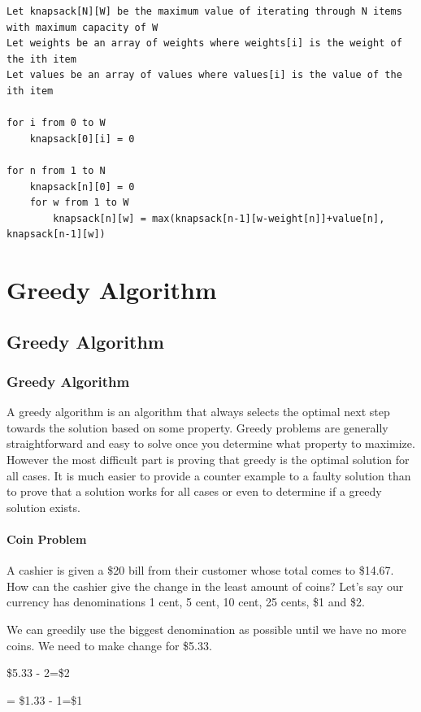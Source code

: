 \documentclass[11pt,oneside]{book}
\begin{document}
\begin{lstlisting}
Let knapsack[N][W] be the maximum value of iterating through N items with maximum capacity of W
Let weights be an array of weights where weights[i] is the weight of the ith item
Let values be an array of values where values[i] is the value of the ith item

for i from 0 to W
    knapsack[0][i] = 0

for n from 1 to N
    knapsack[n][0] = 0
    for w from 1 to W
        knapsack[n][w] = max(knapsack[n-1][w-weight[n]]+value[n], knapsack[n-1][w])
\end{lstlisting}

\part{ Greedy Algorithm }
    \chapter{ Greedy Algorithm }
        \section{ Greedy Algorithm }
        

A greedy algorithm is an algorithm that always selects the optimal next step towards the solution based on some property. Greedy problems are generally straightforward and easy to solve once you determine what property to maximize. However the most difficult part is proving that greedy is the optimal solution for all cases. It is much easier to provide a counter example to a faulty solution than to prove that a solution works for all cases or even to determine if a greedy solution exists.

\subsection{Coin Problem}

A cashier is given a \$20 bill from their customer whose total comes to \$14.67. How can the cashier give the change in the least amount of coins? Let's say our currency has denominations 1 cent, 5 cent, 10 cent, 25 cents, \$1 and \$2.

We can greedily use the biggest denomination as possible until we have no more coins. We need to make change for \$5.33.

\$5.33 - 2=\$2

= \$1.33 - 1=\$1
\end{document}
